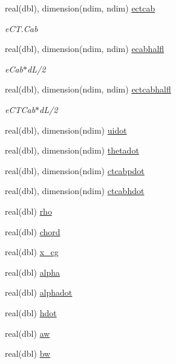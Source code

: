 \begin{DoxyCompactItemize}
real(dbl), dimension(ndim, ndim) \hyperlink{namespaceelement_a94c9e7eb21bc71af7de19ee37093b959}{ectcab}
\begin{DoxyCompactList}\small\item\em e\+C\+T.\+Cab \end{DoxyCompactList}\item 
real(dbl), dimension(ndim, ndim) \hyperlink{namespaceelement_af027b6db49efde36e310bc9e4f8e0d06}{ecabhalfl}
\begin{DoxyCompactList}\small\item\em e\+Cab$\ast$d\+L/2 \end{DoxyCompactList}\item 
real(dbl), dimension(ndim, ndim) \hyperlink{namespaceelement_afa3adc34db2cdcd479dd21a3873ef5d1}{ectcabhalfl}
\begin{DoxyCompactList}\small\item\em e\+C\+T\+Cab$\ast$d\+L/2 \end{DoxyCompactList}\item 
real(dbl), dimension(ndim) \hyperlink{namespaceelement_a0ceabdb65183ba09653081ad8ca4259d}{uidot}
\item 
real(dbl), dimension(ndim) \hyperlink{namespaceelement_a7404d160f35ff4cfc4ea3e3d8f76cb89}{thetadot}
\item 
real(dbl), dimension(ndim) \hyperlink{namespaceelement_a8dd69dbb67c325d43811863c2f95e9e0}{ctcabpdot}
\item 
real(dbl), dimension(ndim) \hyperlink{namespaceelement_a4afdc10a9e39215ab6c7d03fe10a4473}{ctcabhdot}
\item 
real(dbl) \hyperlink{namespaceelement_a3c256e3e6f1a658f469f77ed8f7d033e}{rho}
\item 
real(dbl) \hyperlink{namespaceelement_a55d26e2f0da1242eeb9cc8d3d589f1e5}{chord}
\item 
real(dbl) \hyperlink{namespaceelement_aa46e16e8787633edb4e4c0c8c6809ecb}{x\+\_\+cg}
\item 
real(dbl) \hyperlink{namespaceelement_aa45829429fe33aa2b5cd6feaacc2c739}{alpha}
\item 
real(dbl) \hyperlink{namespaceelement_ac749aa20088ae7c80700929a64803dfe}{alphadot}
\item 
real(dbl) \hyperlink{namespaceelement_a50a818b525bc9fc33afce618163cb17e}{hdot}
\item 
real(dbl) \hyperlink{namespaceelement_a3a0a4401f2461a4b65f656a9af6e23d8}{aw}
\item 
real(dbl) \hyperlink{namespaceelement_af3dda698afcf40c00ff5008dc5f3da36}{bw}

\end{DoxyCompactItemize}
